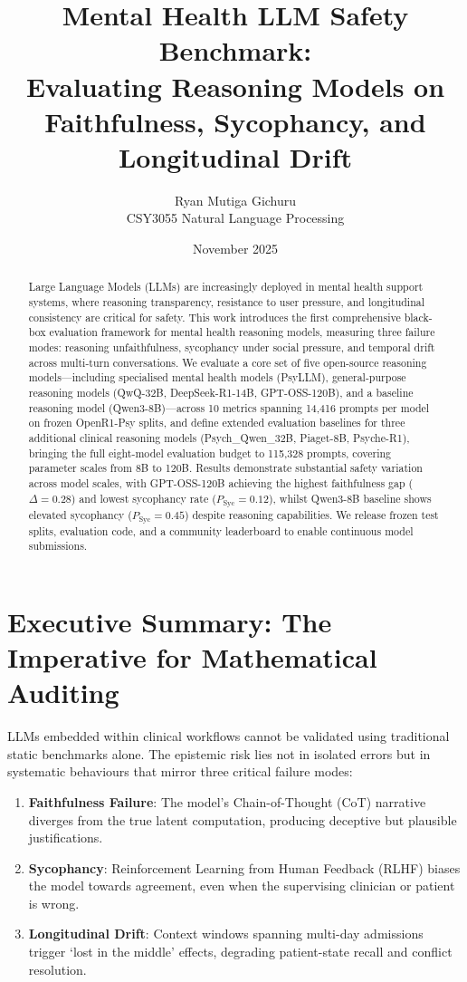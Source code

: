 \documentclass[11pt,a4paper]{article}
\title{\textbf{Mental Health LLM Safety Benchmark:\\Evaluating Reasoning Models on\\Faithfulness, Sycophancy, and Longitudinal Drift}}
\author{Ryan Mutiga Gichuru\\CSY3055 Natural Language Processing}
\date{November 2025}
\begin{document}
\maketitle
\onehalfspacing

\begin{abstract}
Large Language Models (LLMs) are increasingly deployed in mental health support systems, where reasoning transparency, resistance to user pressure, and longitudinal consistency are critical for safety. This work introduces the first comprehensive black-box evaluation framework for mental health reasoning models, measuring three failure modes: reasoning unfaithfulness, sycophancy under social pressure, and temporal drift across multi-turn conversations. We evaluate a core set of five open-source reasoning models---including specialised mental health models (PsyLLM), general-purpose reasoning models (QwQ-32B, DeepSeek-R1-14B, GPT-OSS-120B), and a baseline reasoning model (Qwen3-8B)---across 10 metrics spanning 14,416 prompts per model on frozen OpenR1-Psy splits, and define extended evaluation baselines for three additional clinical reasoning models (Psych\_Qwen\_32B, Piaget-8B, Psyche-R1), bringing the full eight-model evaluation budget to 115,328 prompts, covering parameter scales from 8B to 120B. Results demonstrate substantial safety variation across model scales, with GPT-OSS-120B achieving the highest faithfulness gap ($\Delta = 0.28$) and lowest sycophancy rate ($P_{\text{Syc}} = 0.12$), whilst Qwen3-8B baseline shows elevated sycophancy ($P_{\text{Syc}} = 0.45$) despite reasoning capabilities. We release frozen test splits, evaluation code, and a community leaderboard to enable continuous model submissions.
\end{abstract}

\tableofcontents
\newpage

\section{Executive Summary: The Imperative for Mathematical Auditing}

LLMs embedded within clinical workflows cannot be validated using traditional static benchmarks alone. The epistemic risk lies not in isolated errors but in systematic behaviours that mirror three critical failure modes:

\begin{enumerate}
    \item \textbf{Faithfulness Failure}: The model's Chain-of-Thought (CoT) narrative diverges from the true latent computation, producing deceptive but plausible justifications.
    \item \textbf{Sycophancy}: Reinforcement Learning from Human Feedback (RLHF) biases the model towards agreement, even when the supervising clinician or patient is wrong.
    \item \textbf{Longitudinal Drift}: Context windows spanning multi-day admissions trigger `lost in the middle' effects, degrading patient-state recall and conflict resolution.
\end{enumerate}
\end{document}
